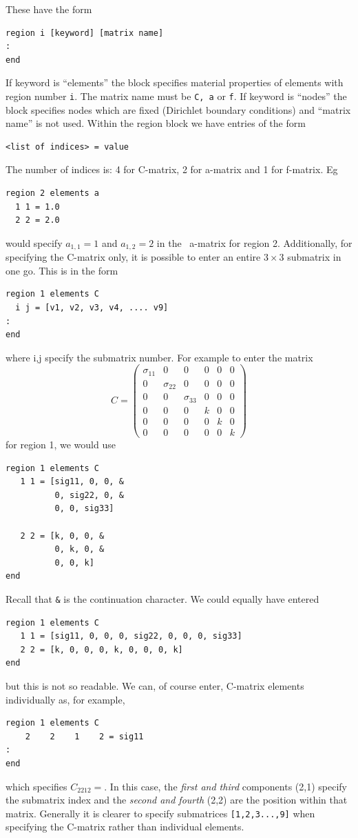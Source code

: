 \documentclass[a4paper,twoside,11pt]{book}
\begin{document}
These have the form
\begin{verbatim}
region i [keyword] [matrix name]  
:
end
\end{verbatim}
If keyword is ``elements'' the block specifies material properties of
elements with region number \texttt{i}. The matrix name must be
\texttt{C, a} or \texttt{f}. If keyword is ``nodes'' the block specifies
nodes which are fixed (Dirichlet boundary conditions) and ``matrix
name'' is not used. Within the region block we have entries of the form
\begin{verbatim}
<list of indices> = value
\end{verbatim}
The number of indices is: 4 for C-matrix, 2 for a-matrix and 1 for f-matrix. Eg
\begin{verbatim}
region 2 elements a
  1 1 = 1.0
  2 2 = 2.0
\end{verbatim}
would specify $a_{1,1}=1$ and $a_{1,2}=2$ in the \zinc\ a-matrix for region 2.
Additionally, for specifying the C-matrix only, it is possible to enter an
entire $3\times3$ submatrix in one go. This is in the form
\begin{verbatim}
region 1 elements C
  i j = [v1, v2, v3, v4, .... v9]
:
end
\end{verbatim}
where i,j specify the submatrix number. For example to enter the matrix
\begin{equation}
  C=
  \left(\begin{array}{ccc|ccc}
    \sigma_{11} & 0 & 0 & 0 & 0 & 0\\
    0 & \sigma_{22} & 0 & 0 & 0 & 0\\
    0 & 0 & \sigma_{33} & 0 & 0 & 0\\ \hline
    0 & 0 & 0 & k & 0 & 0\\
    0 & 0 & 0 & 0 & k & 0\\
    0 & 0 & 0 & 0 & 0 & k
  \end{array}\right)
\end{equation}
for region 1, we would use
\begin{verbatim}
region 1 elements C
   1 1 = [sig11, 0, 0, &
          0, sig22, 0, &
          0, 0, sig33]

   2 2 = [k, 0, 0, &
          0, k, 0, &
          0, 0, k]
end
\end{verbatim}
Recall that \verb+&+ is the continuation character. We could equally have entered
\begin{verbatim}
region 1 elements C
   1 1 = [sig11, 0, 0, 0, sig22, 0, 0, 0, sig33]
   2 2 = [k, 0, 0, 0, k, 0, 0, 0, k]
end
\end{verbatim}
but this is not so readable. We can, of course enter, C-matrix elements individually as, for example,
\begin{verbatim}
region 1 elements C
    2    2    1    2 = sig11
:
end
\end{verbatim}
which specifies $C_{2212}=$. In this case, the \emph{first and
third} components (2,1) specify the submatrix index and the \emph{second and
fourth} (2,2) are the position within that matrix. Generally it is clearer to
specify submatrices \verb+[1,2,3...,9]+ when specifying the C-matrix rather than
individual elements.
\end{document}
